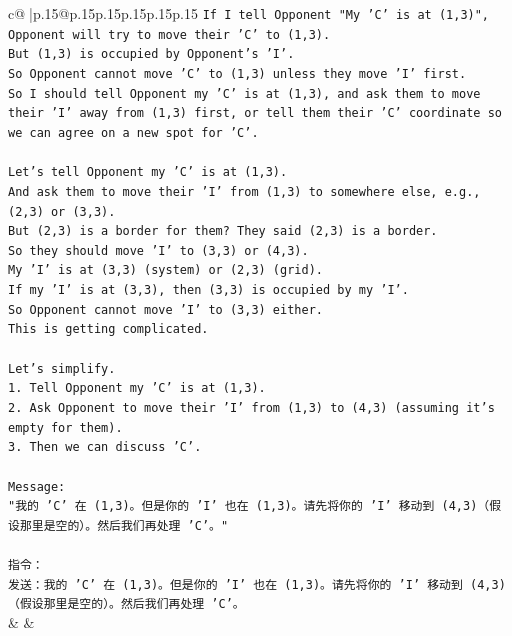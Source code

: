 \documentclass{article}
\begin{document}
{\begin{supertabular}{c@{$\;$}|p{.15\linewidth}@{}p{.15\linewidth}p{.15\linewidth}p{.15\linewidth}p{.15\linewidth}p{.15\linewidth}}
{{{\texttt{If I tell Opponent "My 'C' is at (1,3)", Opponent will try to move their 'C' to (1,3).} \\
\texttt{But (1,3) is occupied by Opponent's 'I'.} \\
\texttt{So Opponent cannot move 'C' to (1,3) unless they move 'I' first.} \\
\texttt{So I should tell Opponent my 'C' is at (1,3), and ask them to move their 'I' away from (1,3) first, or tell them their 'C' coordinate so we can agree on a new spot for 'C'.} \\
\\ 
\texttt{Let's tell Opponent my 'C' is at (1,3).} \\
\texttt{And ask them to move their 'I' from (1,3) to somewhere else, e.g., (2,3) or (3,3).} \\
\texttt{But (2,3) is a border for them? They said (2,3) is a border.} \\
\texttt{So they should move 'I' to (3,3) or (4,3).} \\
\texttt{My 'I' is at (3,3) (system) or (2,3) (grid).} \\
\texttt{If my 'I' is at (3,3), then (3,3) is occupied by my 'I'.} \\
\texttt{So Opponent cannot move 'I' to (3,3) either.} \\
\texttt{This is getting complicated.} \\
\\ 
\texttt{Let's simplify.} \\
\texttt{1. Tell Opponent my 'C' is at (1,3).} \\
\texttt{2. Ask Opponent to move their 'I' from (1,3) to (4,3) (assuming it's empty for them).} \\
\texttt{3. Then we can discuss 'C'.} \\
\\ 
\texttt{Message:} \\
\texttt{"我的 'C' 在 (1,3)。但是你的 'I' 也在 (1,3)。请先将你的 'I' 移动到 (4,3)（假设那里是空的）。然后我们再处理 'C'。"} \\
\\ 
\texttt{指令：} \\
\texttt{发送：我的 'C' 在 (1,3)。但是你的 'I' 也在 (1,3)。请先将你的 'I' 移动到 (4,3)（假设那里是空的）。然后我们再处理 'C'。} \\
            }
        }
    }
    & & \\ \\


\end{supertabular}}
\end{document}
